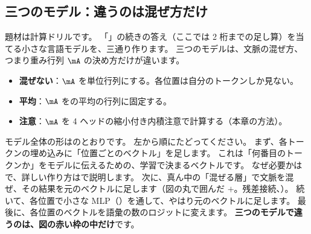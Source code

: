 \subsection*{三つのモデル：違うのは混ぜ方だけ}

題材は計算ドリルです。
「」の続きの答え（ここでは 2 桁までの足し算）を当てる小さな言語モデルを、三通り作ります。
三つのモデルは、文脈の混ぜ方、つまり重み行列 $\mA$ の決め方だけが違います。

\begin{itemize}
\item \textbf{混ぜない}：$\mA$ を単位行列にする。各位置は自分のトークンしか見ない。
\item \textbf{平均}：$\mA$ をの平均の行列に固定する。
\item \textbf{注意}：$\mA$ を 4 ヘッドの縮小付き内積注意で計算する（本章の方法）。
\end{itemize}

モデル全体の形はのとおりです。
左から順にたどってください。
まず、各トークンの埋め込みに「位置ごとのベクトル」を足します。
これは「何番目のトークンか」をモデルに伝えるための、学習で決まるベクトルです。
なぜ必要かはで、詳しい作り方はで説明します。
次に、真ん中の「混ぜる層」で文脈を混ぜ、その結果を元のベクトルに足します（図の丸で囲んだ $+$。残差接続、）。
続いて、各位置で小さな MLP（）を通して、やはり元のベクトルに足します。
最後に、各位置のベクトルを語彙の数のロジットに変えます。
\textbf{三つのモデルで違うのは、図の赤い枠の中だけ}です。

